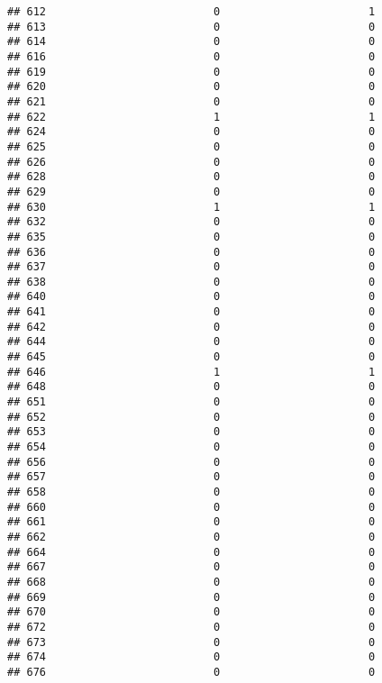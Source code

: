 \documentclass[
]{article}
\begin{document}
\begin{verbatim}
## 612                          0                       1
## 613                          0                       0
## 614                          0                       0
## 616                          0                       0
## 619                          0                       0
## 620                          0                       0
## 621                          0                       0
## 622                          1                       1
## 624                          0                       0
## 625                          0                       0
## 626                          0                       0
## 628                          0                       0
## 629                          0                       0
## 630                          1                       1
## 632                          0                       0
## 635                          0                       0
## 636                          0                       0
## 637                          0                       0
## 638                          0                       0
## 640                          0                       0
## 641                          0                       0
## 642                          0                       0
## 644                          0                       0
## 645                          0                       0
## 646                          1                       1
## 648                          0                       0
## 651                          0                       0
## 652                          0                       0
## 653                          0                       0
## 654                          0                       0
## 656                          0                       0
## 657                          0                       0
## 658                          0                       0
## 660                          0                       0
## 661                          0                       0
## 662                          0                       0
## 664                          0                       0
## 667                          0                       0
## 668                          0                       0
## 669                          0                       0
## 670                          0                       0
## 672                          0                       0
## 673                          0                       0
## 674                          0                       0
## 676                          0                       0

\end{verbatim}
\end{document}
